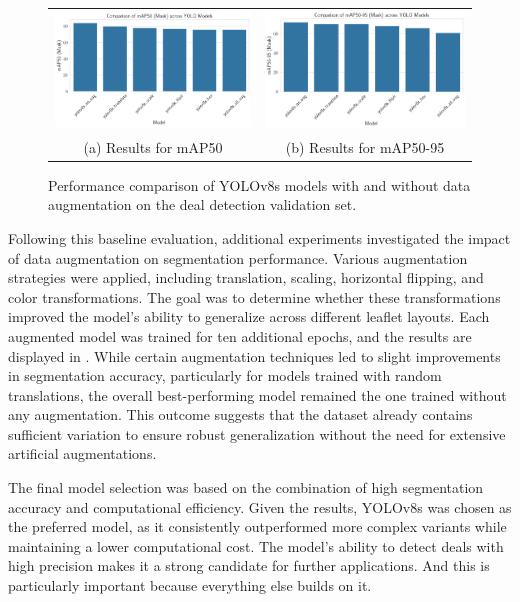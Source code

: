 \documentclass[11pt]{article}
\begin{document}
\begin{figure}[h!]
    \centering
    \begin{tabular}{cc}
    \includegraphics[width=0.5\linewidth]{figures/deal_detection/map50_yolo8.png} &   \includegraphics[width=0.5\linewidth]{figures/deal_detection/map50_95_yolo8.png} \\
    (a) Results for mAP50 & (b) Results for mAP50-95 \\[2pt]
    \end{tabular}
    \caption{Performance comparison of YOLOv8s models with and without data augmentation on the deal detection validation set.}
    \label{fig:yolo8_results}
\end{figure}

Following this baseline evaluation, additional experiments investigated the impact of data augmentation on segmentation performance. Various augmentation strategies were applied, including translation, scaling, horizontal flipping, and color transformations. The goal was to determine whether these transformations improved the model's ability to generalize across different leaflet layouts. Each augmented model was trained for ten additional epochs, and the results are displayed in . While certain augmentation techniques led to slight improvements in segmentation accuracy, particularly for models trained with random translations, the overall best-performing model remained the one trained without any augmentation. This outcome suggests that the dataset already contains sufficient variation to ensure robust generalization without the need for extensive artificial augmentations.

The final model selection was based on the combination of high segmentation accuracy and computational efficiency. Given the results, YOLOv8s was chosen as the preferred model, as it consistently outperformed more complex variants while maintaining a lower computational cost. The model's ability to detect deals with high precision makes it a strong candidate for further applications. And this is particularly important because everything else builds on it.
\end{document}
